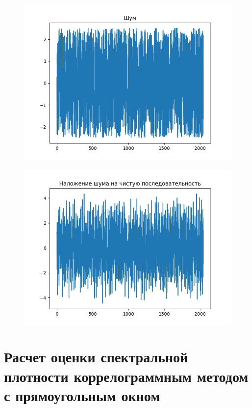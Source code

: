 \documentclass[12pt]{article}
\begin{document}
\begin{figure}[!htb]
\centering
\includegraphics[scale=1.00]{bad.png}
\caption{}
\label{}
\end{figure}

\begin{figure}[!htb]
\centering
\includegraphics[scale=1.00]{ugly.png}
\caption{}
\label{}
\end{figure}


\section{Расчет оценки спектральной плотности коррелограммным методом с прямоугольным окном}
\end{document}
